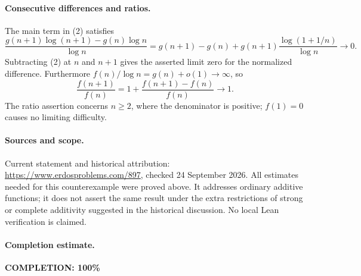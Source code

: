 \paragraph{Consecutive differences and ratios.}
The main term in (2) satisfies
\[
 \frac{g(n+1)\log(n+1)-g(n)\log n}{\log n}
 =g(n+1)-g(n)
  +g(n+1)\frac{\log(1+1/n)}{\log n}\longrightarrow0.
\]
Subtracting (2) at \(n\) and \(n+1\) gives the asserted
limit zero for the normalized difference.
Furthermore \(f(n)/\log n=g(n)+o(1)\to\infty\), so
\[
 \frac{f(n+1)}{f(n)}
 =1+\frac{f(n+1)-f(n)}{f(n)}\longrightarrow1.
\]
The ratio assertion concerns \(n\geq2\), where the denominator
is positive; \(f(1)=0\) causes no limiting difficulty.

\paragraph{Sources and scope.}
Current statement and historical attribution:
\url{https://www.erdosproblems.com/897}, checked 24 September 2026.
All estimates needed for this counterexample were proved above.
It addresses ordinary additive functions; it does not assert
the same result under the extra restrictions of strong or
complete additivity suggested in the historical discussion.
No local Lean verification is claimed.

\paragraph{Completion estimate.}
\textbf{COMPLETION: 100\%}
